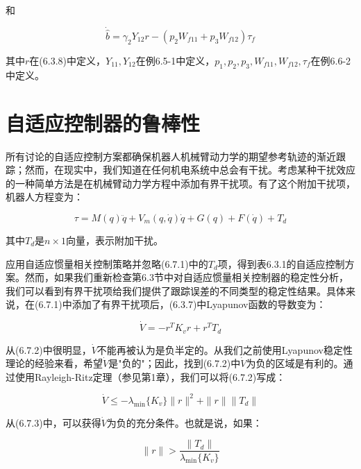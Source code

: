 \documentclass[12pt,a4paper]{ctexart}
\begin{document}
和

\begin{equation}
\dot{\hat{b}} = \gamma_2 Y_{12} r - (p_2 W_{f11} + p_3 W_{f12})\tau_f
\end{equation}

其中$r$在(6.3.8)中定义，$Y_{11}, Y_{12}$在例6.5-1中定义，$p_1, p_2, p_3, W_{f11}, W_{f12}, \tau_f$在例6.6-2中定义。

\section{自适应控制器的鲁棒性}\label{sec:robustness}

所有讨论的自适应控制方案都确保机器人机械臂动力学的期望参考轨迹的渐近跟踪；然而，在现实中，我们知道在任何机电系统中总会有干扰。考虑某种干扰效应的一种简单方法是在机械臂动力学方程中添加有界干扰项。有了这个附加干扰项，机器人方程变为：

\begin{equation}\label{eq:disturbance}
\tau = M(q)\ddot{q} + V_m(q, \dot{q})\dot{q} + G(q) + F(\dot{q}) + T_d
\end{equation}

其中$T_d$是$n \times 1$向量，表示附加干扰。

应用自适应惯量相关控制策略并忽略(6.7.1)中的$T_d$项，得到表6.3.1的自适应控制方案。然而，如果我们重新检查第6.3节中对自适应惯量相关控制器的稳定性分析，我们可以看到有界干扰项给我们提供了跟踪误差的不同类型的稳定性结果。具体来说，在(6.7.1)中添加了有界干扰项后，(6.3.7)中Lyapunov函数的导数变为：

\begin{equation}\label{eq:lyapunov-disturbance}
\dot{V} = -r^T K_v r + r^T T_d
\end{equation}

从(6.7.2)中很明显，$\dot{V}$不能再被认为是负半定的。从我们之前使用Lyapunov稳定性理论的经验来看，希望$\dot{V}$是"负的"；因此，找到(6.7.2)中$\dot{V}$为负的区域是有利的。通过使用Rayleigh-Ritz定理（参见第1章），我们可以将(6.7.2)写成：

\begin{equation}\label{eq:rayleigh}
\dot{V} \leq -\lambda_{\min}\{K_v\}\|r\|^2 + \|r\|\|T_d\|
\end{equation}

从(6.7.3)中，可以获得$\dot{V}$为负的充分条件。也就是说，如果：

\begin{equation}\label{eq:condition}
\|r\| > \frac{\|T_d\|}{\lambda_{\min}\{K_v\}}
\end{equation}
\end{document}
